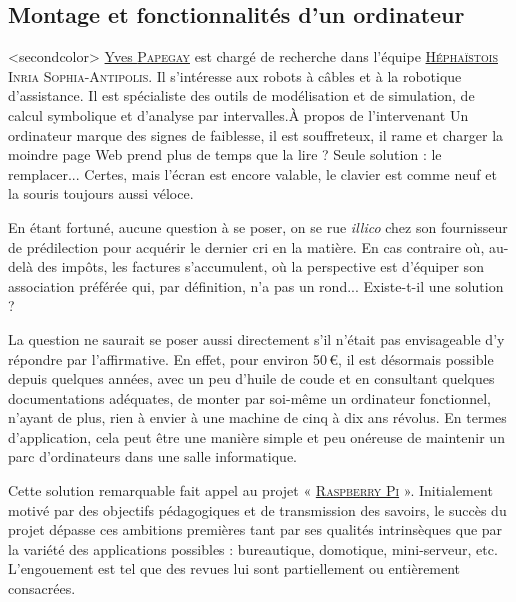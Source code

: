 
\subsection[Montage et fonctionnalités]{Montage et fonctionnalités d'un ordinateur}
\label{sub:I.1.2}

\caution[t]<secondcolor>{%
\href{http://yves.papegay.fr/}{Yves \textsc{Papegay}} est chargé de recherche dans l'équipe \href{https://team.inria.fr/hephaistos/fr/}{\textsc{Héphaïstois}} \textsc{Inria} \textsc{Sophia-Antipolis}. Il s'intéresse aux robots à câbles et à la robotique d'assistance. Il est spécialiste des outils de modélisation et de simulation, de calcul symbolique et d'analyse par intervalles.}{À propos de l'intervenant}
Un ordinateur marque des signes de faiblesse, il est souffreteux, il rame et charger la moindre page Web prend plus de temps que la lire ? Seule solution : le remplacer... Certes, mais l'écran est encore valable, le clavier est comme neuf et la souris toujours aussi véloce.

En étant fortuné, aucune question à se poser, on se rue \textit{illico} chez son fournisseur de prédilection pour acquérir le dernier cri en la matière. En cas contraire où, au-delà des impôts, les factures s'accumulent, où la perspective est d'équiper son association préférée qui, par définition, n'a pas un rond... Existe-t-il une solution ?

La question ne saurait se poser aussi directement s'il n'était pas envisageable d'y répondre par l'affirmative. En effet, pour environ 50\,€, il est désormais possible depuis quelques années, avec un peu d'huile de coude et en consultant quelques documentations adéquates, de monter par soi-même un ordinateur fonctionnel, n'ayant de plus, rien à envier à une machine de cinq à dix ans révolus. En termes d'application, cela peut être une manière simple et peu onéreuse de maintenir un parc d'ordinateurs dans une salle informatique.

Cette solution remarquable fait appel au projet « \href{https://www.raspberrypi.org/}{\textsc{Raspberry Pi}} ». Initialement motivé par des objectifs pédagogiques et de transmission des savoirs, le succès du projet dépasse ces ambitions premières tant par ses qualités intrinsèques que par la variété des applications possibles : bureautique, domotique, mini-serveur, etc. L'engouement est tel que des revues lui sont partiellement ou entièrement consacrées.

